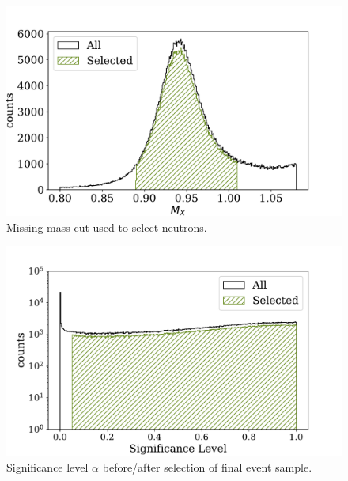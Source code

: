 \begin{figure}
  \begin{center}
    \includegraphics[width=\columnwidth]{image/missing_mass.pdf}
    \caption{Missing mass cut used to select neutrons.}
  \end{center}
\end{figure}

\begin{figure}
  \begin{center}
    \includegraphics[width=\columnwidth]{image/significance.pdf}
    \caption{Significance level $\alpha$ before/after selection of final event sample.}
  \end{center}
\end{figure}

